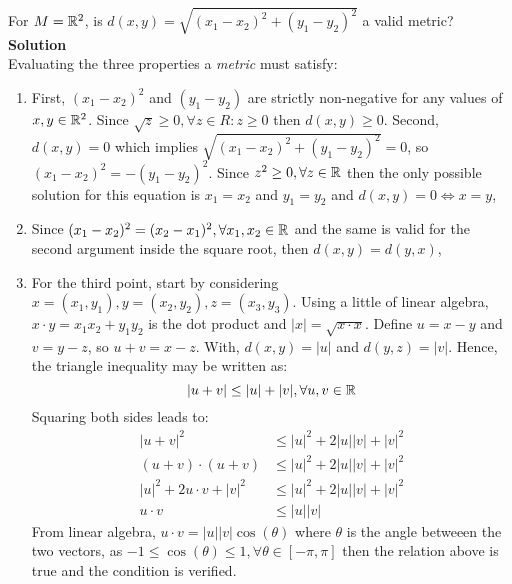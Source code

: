 \begin{eg}
    For $M = \mathbb{R}^2$, is $d(x, y) = \sqrt{(x_1 -  x_2)^2 + (y_1 - y_2)^2}$ a valid metric? \\
    \textbf{Solution} \\
    Evaluating the three properties a \emph{metric} must satisfy:
    \begin{enumerate}
        \item First, $(x_1 - x_2)^2$ and $(y_1 - y_2)$ are strictly non-negative for any values of $x,y \in \mathbb{R}^2$. Since $\sqrt{z} \geq 0, \forall z \in R : z \geq 0$ then $d(x, y) \geq 0$. Second, $d(x, y) = 0$ which implies $\sqrt{(x_1 - x_2)^2 + (y_1- y_2)^2} = 0$, so $(x_1 - x_2)^2 = - (y_1 - y_2)^2$. Since $z^2 \geq 0, \forall z \in \mathbb{R}$ then the only possible solution for this equation is $x_1 = x_2$ and $y_1 = y_2$ and $d(x, y) = 0 \Longleftrightarrow x = y$,
        \item Since $(x_1 - x_2)^2 = (x_2 - x_1)^2, \forall x_1, x_2 \in \mathbb{R}$ and the same is valid for the second argument inside the square root, then $d(x, y) = d(y, x)$,
        \item For the third point, start by considering $x = (x_1, y_1), y = (x_2, y_2), z = (x_3, y_3)$. Using a little of linear algebra, $x \cdot y = x_1x_2 + y_1y_2$ is the dot product and $|x| = \sqrt{x \cdot x}$. Define $u = x - y$ and $v = y - z$, so $u + v = x - z$. With, $d(x,y) = |u|$ and $d(y,z) = |v|$. Hence, the triangle inequality may be written as:
        \begin{equation*}
            |u + v| \leq |u| + |v|, \forall u, v \in \mathbb{R}
        \end{equation*}
        Squaring both sides leads to:
        \begin{align*}
            |u + v|^2 &\leq |u|^2 + 2|u||v| + |v|^2 \\
            (u + v) \cdot (u + v) &\leq |u|^2 + 2|u||v| + |v|^2 \\
            |u|^2 + 2u\cdot v + |v|^2 &\leq |u|^2 + 2|u||v| + |v|^2 \\
            u\cdot v &\leq |u||v|
        \end{align*}
        From linear algebra, $u \cdot v = |u||v|\cos(\theta)$ where $\theta$ is the angle betweeen the two vectors, as $-1 \leq \cos(\theta) \leq 1 ,\forall \theta \in [-\pi, \pi]$ then the relation above is true and the condition is verified.
    \end{enumerate}
\end{eg}

